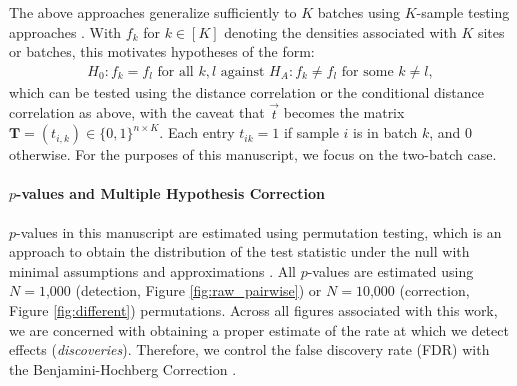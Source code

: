 The above approaches generalize sufficiently to $K$ batches using $K$-sample testing approaches \cite{Bridgeford2023Jul}. With $f_k$ for $k \in [K]$ denoting the densities associated with $K$ sites or batches, this motivates hypotheses of the form:
\begin{align*}
    H_0 : f_k = f_l \text{ for all }k, l \text{ against }H_A: f_k \neq f_l \text{ for some }k \neq l,
\end{align*}
which can be tested using the distance correlation or the conditional distance correlation as above, with the caveat that $\vec t$ becomes the matrix $\mathbf T = (t_{i,k}) \in \{0, 1\}^{n \times K}$. Each entry $t_{ik} = 1$ if sample $i$ is in batch $k$, and $0$ otherwise. For the purposes of this manuscript, we focus on the two-batch case.

\paragraph{$p$-values and Multiple Hypothesis Correction}

$p$-values in this manuscript are estimated using permutation testing, which is an approach to obtain the distribution of the test statistic under the null with minimal assumptions and approximations \cite{Efron2004Mar}. All $p$-values are estimated using $N=1$,$000$ (detection, Figure \ref{fig:raw_pairwise}) or $N=10$,$000$ (correction, Figure \ref{fig:different}) permutations. Across all figures associated with this work, we are concerned with obtaining a proper estimate of the rate at which we detect effects (\textit{discoveries}). Therefore, we control the false discovery rate (FDR) with the Benjamini-Hochberg Correction \cite{BH}. 





